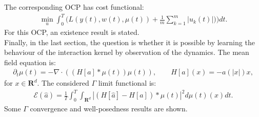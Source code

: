 \documentclass[11pt, a4paper]{article}
\theoremstyle{definition}
\begin{document}
The corresponding OCP has cost functional:
\begin{align*}
\min_{u} \int_0^T \bigg( L(y(t),w(t),\mu(t)) + \frac{1}{m} \sum_{k=1}^m |u_k(t)|)\bigg)dt.
\end{align*}
For this OCP, an existence result is stated.\\
Finally, in the last section, the question is whether it is possible by learning the behaviour of the interaction kernel by observation of the dynamics.
The mean field equation is:
\begin{align*}
\partial_t \mu(t) = - \nabla \cdot((H[a] \ast \mu(t))\mu(t)), \qquad H[a](x)=-a(|x|)x,
\end{align*}
for $x \in \mathbf{R}^d$.
The considered $\Gamma$ limit functional is:
\begin{align*}
\mathcal{E}(\hat a) = \frac{1}{T} \int_0^T \int_{\mathbf{R}^d} | (H[\hat a] - H[a]) \ast \mu(t) |^2 d \mu(t)(x)dt.
\end{align*}
Some $\Gamma$ convergence and well-posedness results are shown.
\end{document}
